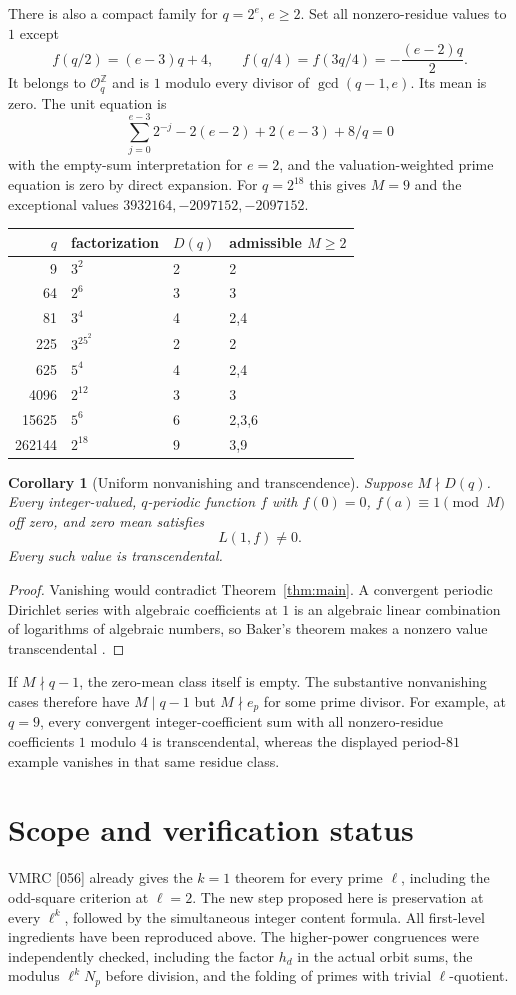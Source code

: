\documentclass[11pt]{article}
\newtheorem{corollary}[theorem]{Corollary}
\newcommand{\Z}{\mathbb Z}
\newcommand{\OO}{\mathcal O}
\begin{document}
There is also a compact family for $q=2^e$, $e\ge2$. Set all nonzero-residue values to $1$ except
\[
 f(q/2)=(e-3)q+4,\qquad f(q/4)=f(3q/4)=-\frac{(e-2)q}{2}.
\]
It belongs to $\OO_q^{\Z}$ and is $1$ modulo every divisor of $\gcd(q-1,e)$. Its mean is zero. The unit equation is
\[
 \sum_{j=0}^{e-3}2^{-j}
 -2(e-2)+2(e-3)+8/q=0
\]
with the empty-sum interpretation for $e=2$, and the valuation-weighted prime equation is zero by direct expansion. For $q=2^{18}$ this gives $M=9$ and the exceptional values $3932164,-2097152,-2097152$.

\begin{center}
\begin{tabular}{rlll}
\toprule
$q$&factorization&$D(q)$&admissible $M\ge2$\\\midrule
9&$3^2$&2&2\\
64&$2^6$&3&3\\
81&$3^4$&4&2,4\\
225&$3^25^2$&2&2\\
625&$5^4$&4&2,4\\
4096&$2^{12}$&3&3\\
15625&$5^6$&6&2,3,6\\
262144&$2^{18}$&9&3,9\\\bottomrule
\end{tabular}
\end{center}

\begin{corollary}[Uniform nonvanishing and transcendence]
Suppose $M\nmid D(q)$. Every integer-valued, $q$-periodic function $f$ with $f(0)=0$, $f(a)\equiv1\pmod M$ off zero, and zero mean satisfies
\[
 L(1,f)\ne0.
\]
Every such value is transcendental.
\end{corollary}
\begin{proof}
Vanishing would contradict Theorem~\ref{thm:main}. A convergent periodic Dirichlet series with algebraic coefficients at $1$ is an algebraic linear combination of logarithms of algebraic numbers, so Baker's theorem makes a nonzero value transcendental \cite{BBW,Baker}.
\end{proof}
If $M\nmid q-1$, the zero-mean class itself is empty. The substantive nonvanishing cases therefore have $M\mid q-1$ but $M\nmid e_p$ for some prime divisor. For example, at $q=9$, every convergent integer-coefficient sum with all nonzero-residue coefficients $1$ modulo $4$ is transcendental, whereas the displayed period-$81$ example vanishes in that same residue class.

\section{Scope and verification status}
VMRC [056] already gives the $k=1$ theorem for every prime $\ell$, including the odd-square criterion at $\ell=2$. The new step proposed here is preservation at every $\ell^k$, followed by the simultaneous integer content formula. All first-level ingredients have been reproduced above. The higher-power congruences were independently checked, including the factor $h_d$ in the actual orbit sums, the modulus $\ell^kN_p$ before division, and the folding of primes with trivial $\ell$-quotient.
\end{document}
